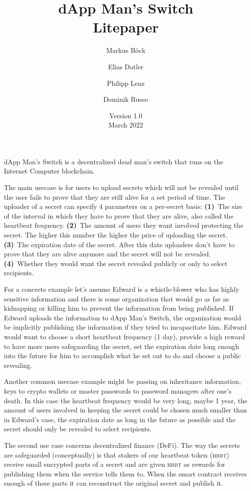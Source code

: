 \documentclass[
  11.5pt,
  a4paper,
  USenglish
]{article}
\title{\huge dApp Man's Switch\\[5mm]\large Litepaper}
\author{
Markus Böck \and
Elias Datler \and
Philipp Lenz \and
Dominik Russo}
\date{Version 1.0\\[1mm]March 2022}
\begin{document}
\maketitle

dApp Man's Switch is a decentralized dead man's switch that runs on the Internet Computer blockchain.

The  main usecase is for users to upload secrets which will not be revealed until the user fails to prove that they are still alive for a set period of time.
The uploader of a secret can specify 4 parameters on a per-secret basis:
\textbf{(1)}~The size of the interval in which they have to prove that they are alive, also called the heartbeat frequency.
\textbf{(2)}~The amount of users they want involved protecting the secret.
The higher this number the higher the price of uploading the secret.
\textbf{(3)}~The expiration date of the secret.
After this date uploaders don't have to prove that they are alive anymore and the secret will not be revealed.
\textbf{(4)}~Whether they would want the secret revealed publicly or only to select recipients.

For a concrete example let's assume Edward is a whistle-blower who has highly sensitive information and there is some organization that would go as far as kidnapping or killing him to prevent the information from being published.
If Edward uploads the information to dApp Man's Switch, the organization would be implicitly publishing the information if they tried to incapacitate him.
Edward would want to choose a short heartbeat frequency (1 day), provide a high reward to have more users safeguarding the secret, set the expiration date long enough into the future for him to accomplish what he set out to do and choose a public revealing.

Another common usecase example might be passing on inheritance information, keys to crypto wallets or master passwords to password managers after one's death.
In this case the heartbeat frequency would be very long, maybe 1 year, the amount of users involved in keeping the secret could be chosen much smaller than in Edward's case, the expiration date as long in the future as possible and the secret should only be revealed to select recipients.

The  second use case concerns decentralized finance (DeFi).
The way the secrets are safeguarded (conceptually) is that stakers of our heartbeat token (\textsc{hrbt}) receive small encrypted parts of a secret and are given \textsc{hrbt} as rewards for publishing them when the service tells them to.
When the smart contract receives enough of these parts it can reconstruct the original secret and publish it.
\end{document}
